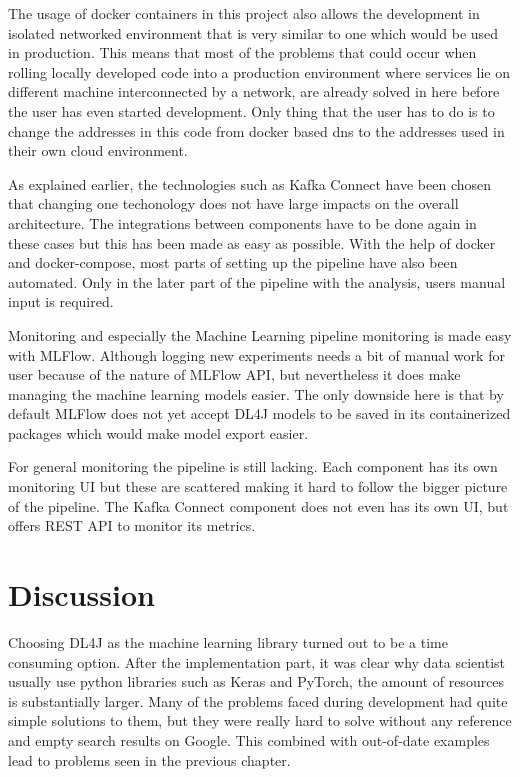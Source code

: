 The usage of docker containers in this project also allows the development in isolated networked environment that is very similar to one which would be used in production.
This means that most of the problems that could occur when rolling locally developed code into a production environment where services lie on different machine interconnected by a network, are already solved in here before the user has even started development.
Only thing that the user has to do is to change the addresses in this code from docker based dns to the addresses used in their own cloud environment.

As explained earlier, the technologies such as Kafka Connect have been chosen that changing one techonology does not have large impacts on the overall architecture.
The integrations between components have to be done again in these cases but this has been made as easy as possible.
With the help of docker and docker-compose, most parts of setting up the pipeline have also been automated.
Only in the later part of the pipeline with the analysis, users manual input is required.

Monitoring and especially the Machine Learning pipeline monitoring is made easy with MLFlow.
Although logging new experiments needs a bit of manual work for user because of the nature of MLFlow API, but nevertheless it does make managing the machine learning models easier.
The only downside here is that by default MLFlow does not yet accept DL4J models to be saved in its containerized packages which would make model export easier.

For general monitoring the pipeline is still lacking.
Each component has its own monitoring UI but these are scattered making it hard to follow the bigger picture of the pipeline.
The Kafka Connect component does not even has its own UI, but offers REST API to monitor its metrics.

\section{Discussion}

Choosing DL4J as the machine learning library turned out to be a time consuming option.
After the implementation part, it was clear why data scientist usually use python libraries such as Keras and PyTorch, the amount of resources is substantially larger.
Many of the problems faced during development had quite simple solutions to them, but they were really hard to solve without any reference and empty search results on Google.
This combined with out-of-date examples lead to problems seen in the previous chapter.

